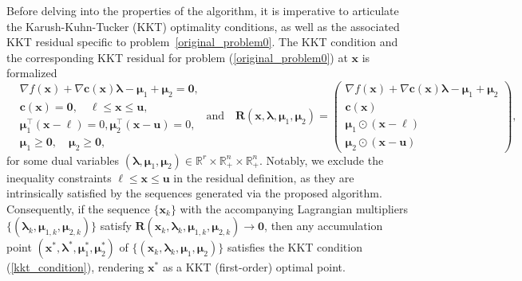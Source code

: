 \documentclass[aos]{imsart}
\numberwithin{equation}{section}
\theoremstyle{plain}
\begin{document}
Before delving into the properties of the algorithm, it is imperative to articulate the Karush-Kuhn-Tucker (KKT) optimality conditions, as well as the associated KKT residual specific to problem~\eqref{original_problem0}. 
    The KKT condition and  the corresponding KKT residual for problem (\ref{original_problem0}) at $\bm{x}$ is formalized
    \begin{equation}
    \label{kkt_condition}
        \begin{split}
            & \nabla f (\bm{x}) + \nabla \bm{c}(\bm{x}) \bm{\lambda} - \bm{\mu}_1 + \bm{\mu}_2 = \bm{0},\\
            & \bm{c}(\bm{x}) = \bm{0},\quad \bm{\ell} \leq \bm{x} \leq \bm{u},\\
            & \bm{\mu}_1^{\top} (\bm{x} - \bm{\ell}) = 0,  \bm{\mu}_2^{\top} (\bm{x} - \bm{u}) = 0,\\
            & \bm{\mu}_1 \geq \bm{0}, \quad \bm{\mu}_2 \geq \bm{0},
        \end{split} ~\text{and} \quad
        \bm{R}(\bm{x},\bm{\lambda},\bm{\mu}_1,\bm{\mu}_2) = \left ( \begin{array}{c}
             \nabla f (\bm{x}) + \nabla \bm{c}(\bm{x}) \bm{\lambda} - \bm{\mu}_1 + \bm{\mu}_2  \\
            \bm{c}(\bm{x}) \\
            \bm{\mu}_1 \odot (\bm{x} - \bm{\ell})\\
            \bm{\mu}_2 \odot (\bm{x} - \bm{u})
        \end{array}\right),
    \end{equation}
    for some dual variables $(\bm{\lambda}, \bm{\mu}_1, \bm{\mu}_2) \in \mathbb{R}^{r} \times \mathbb{R}^{n}_{+} \times \mathbb{R}^{n}_{+}$. Notably, we exclude the inequality constraints $\bm{\ell} \leq \bm{x} \leq \bm{u}$ in the residual definition, as they are intrinsically satisfied by the sequences generated via the proposed algorithm.
    Consequently, if the sequence $\{\bm{x}_k\}$ with the accompanying Lagrangian multipliers $\{(\bm{\lambda}_k, \bm{\mu}_{1,k}, \bm{\mu}_{2,k})\}$ satisfy $\bm{R}(\bm{x}_k, \bm{\lambda}_k, \bm{\mu}_{1,k}, \bm{\mu}_{2,k}) \to \bm{0}$, then any accumulation point $(\bm{x}^{*},\bm{\lambda}^{*},\bm{\mu}_1^{*},\bm{\mu}_2^{*})$ of $\{(\bm{x}_k,\bm{\lambda}_k, \bm{\mu}_1, \bm{\mu}_2)\}$ satisfies the KKT condition (\ref{kkt_condition}), rendering $\bm{x}^{*}$ as a KKT (first-order) optimal point.
\end{document}
